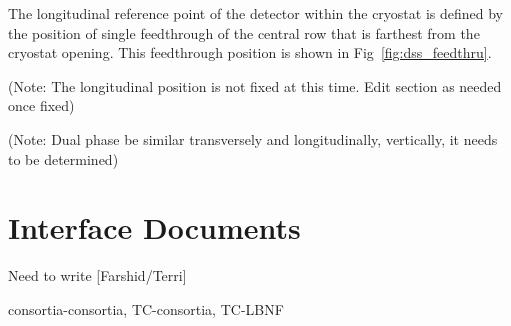 The longitudinal reference point of the detector within the cryostat
is defined by the position of single feedthrough of the central row
that is farthest from the cryostat opening. This feedthrough position
is shown in Fig~\ref{fig:dss_feedthru}.

(Note: The longitudinal position is not fixed at this time. Edit
section as needed once fixed)

(Note: Dual phase be similar
transversely and longitudinally, vertically, it needs to be
determined)


\section{Interface Documents}
\label{sec:fdsp-coord-integ-interface}
Need to write [Farshid/Terri]

consortia-consortia, TC-consortia, TC-LBNF



